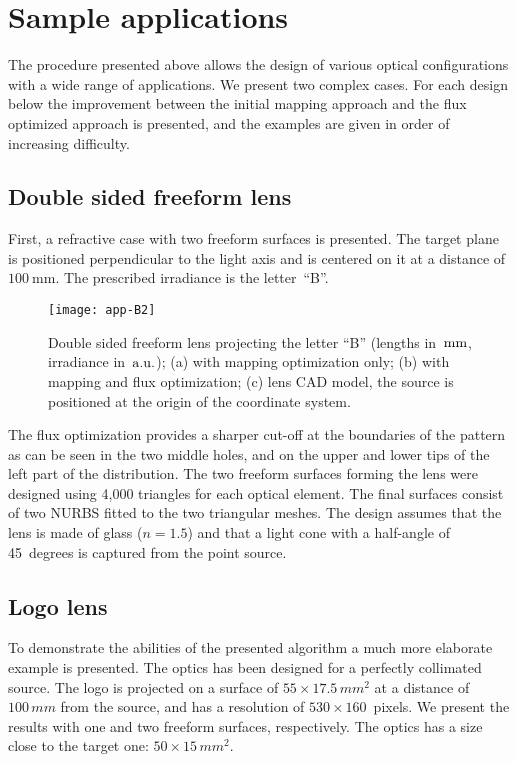 \section{Sample applications}
\label{sec:results}
The procedure presented above allows the design of various optical
configurations with a wide range of applications. We present two
complex cases. For each design below the improvement between the
initial mapping approach and the flux optimized approach is presented,
and the examples are given in order of increasing difficulty.

\subsection{Double sided freeform lens}
First, a refractive case with two freeform surfaces is presented.  The
target plane is positioned perpendicular to the light axis and is
centered on it at a distance of $100\mathrm{~mm}$.  The prescribed irradiance
is the letter~``B''.

\begin{figure}[!htbp]
  \centering \texttt{[image: app-B2]}
  \caption{Double sided freeform lens projecting the letter ``B''
    (lengths in~$\rm mm$, irradiance in~$\rm a.u.$); (a) with mapping
    optimization only; (b) with mapping and flux optimization; (c)
    lens CAD model, the source is positioned at the origin of the
    coordinate system.  }
  \label{fig:letter}
\end{figure}

The flux optimization provides a sharper cut-off at the boundaries of
the pattern as can be seen in the two middle holes, and on the upper
and lower tips of the left part of the distribution.  The two freeform
surfaces forming the lens were designed using 4,000 triangles for each
optical element.  The final surfaces consist of two NURBS fitted to
the two triangular meshes.  The design assumes that the lens is made
of glass ($n=1.5$) and that a light cone with a half-angle of
45~degrees is captured from the point source.

\subsection{Logo lens}
To demonstrate the abilities of the presented algorithm a much more
elaborate example is presented.  The optics has been designed for a
perfectly collimated source. The logo is projected on a surface of $55
\times 17.5\,mm^2$ at a distance of $100\,mm$ from the source, and has
a resolution of $530 \times 160$~pixels. We present the results with
one and two freeform surfaces, respectively. The optics has a size
close to the target one: $50 \times 15\,mm^2$.

